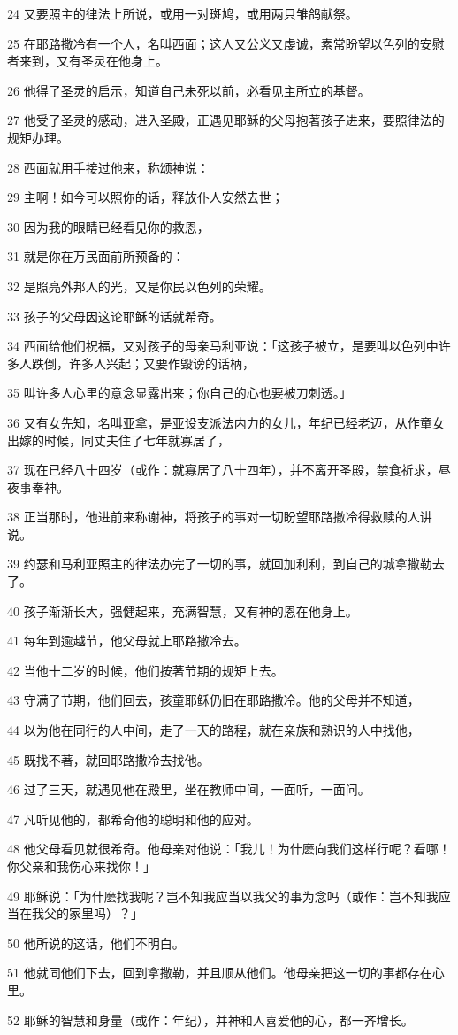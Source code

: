 \par 24 又要照主的律法上所说，或用一对斑鸠，或用两只雏鸽献祭。
\par 25 在耶路撒冷有一个人，名叫西面；这人又公义又虔诚，素常盼望以色列的安慰者来到，又有圣灵在他身上。
\par 26 他得了圣灵的启示，知道自己未死以前，必看见主所立的基督。
\par 27 他受了圣灵的感动，进入圣殿，正遇见耶稣的父母抱著孩子进来，要照律法的规矩办理。
\par 28 西面就用手接过他来，称颂神说：
\par 29 主啊！如今可以照你的话，释放仆人安然去世；
\par 30 因为我的眼睛已经看见你的救恩，
\par 31 就是你在万民面前所预备的：
\par 32 是照亮外邦人的光，又是你民以色列的荣耀。
\par 33 孩子的父母因这论耶稣的话就希奇。
\par 34 西面给他们祝福，又对孩子的母亲马利亚说：「这孩子被立，是要叫以色列中许多人跌倒，许多人兴起；又要作毁谤的话柄，
\par 35 叫许多人心里的意念显露出来；你自己的心也要被刀刺透。」
\par 36 又有女先知，名叫亚拿，是亚设支派法内力的女儿，年纪已经老迈，从作童女出嫁的时候，同丈夫住了七年就寡居了，
\par 37 现在已经八十四岁（或作：就寡居了八十四年），并不离开圣殿，禁食祈求，昼夜事奉神。
\par 38 正当那时，他进前来称谢神，将孩子的事对一切盼望耶路撒冷得救赎的人讲说。
\par 39 约瑟和马利亚照主的律法办完了一切的事，就回加利利，到自己的城拿撒勒去了。
\par 40 孩子渐渐长大，强健起来，充满智慧，又有神的恩在他身上。
\par 41 每年到逾越节，他父母就上耶路撒冷去。
\par 42 当他十二岁的时候，他们按著节期的规矩上去。
\par 43 守满了节期，他们回去，孩童耶稣仍旧在耶路撒冷。他的父母并不知道，
\par 44 以为他在同行的人中间，走了一天的路程，就在亲族和熟识的人中找他，
\par 45 既找不著，就回耶路撒冷去找他。
\par 46 过了三天，就遇见他在殿里，坐在教师中间，一面听，一面问。
\par 47 凡听见他的，都希奇他的聪明和他的应对。
\par 48 他父母看见就很希奇。他母亲对他说：「我儿！为什麽向我们这样行呢？看哪！你父亲和我伤心来找你！」
\par 49 耶稣说：「为什麽找我呢？岂不知我应当以我父的事为念吗（或作：岂不知我应当在我父的家里吗）？」
\par 50 他所说的这话，他们不明白。
\par 51 他就同他们下去，回到拿撒勒，并且顺从他们。他母亲把这一切的事都存在心里。
\par 52 耶稣的智慧和身量（或作：年纪），并神和人喜爱他的心，都一齐增长。

